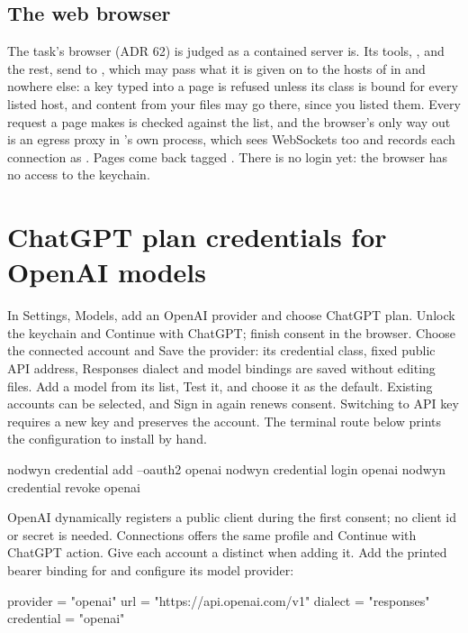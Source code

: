 \subsection*{The web browser}

The task's browser (ADR 62) is judged as a contained server is. Its tools,
,  and the rest, send to
, which may pass what it is given on to the hosts of
 in  and nowhere else: a key typed
into a page is refused unless its class is bound for every listed host,
and content from your files may go there, since you listed them. Every
request a page makes is checked against the list, and the browser's only
way out is an egress proxy in \nodwyn{}'s own process, which sees
WebSockets too and records each connection as .
Pages come back tagged . There is no login yet: the
browser has no access to the keychain.


\section{ChatGPT plan credentials for OpenAI models}

In Settings, Models, add an OpenAI provider and choose ChatGPT plan.
Unlock the keychain and Continue with ChatGPT; finish consent in the browser.
Choose the connected account and Save the provider: its credential class,
fixed public API address, Responses dialect and model bindings are saved
without editing files. Add a model from its list, Test it, and choose it as
the default. Existing accounts can be selected, and Sign in again renews
consent. Switching to API key requires a new key and preserves the account.
The terminal route below prints the configuration to install by hand.


\begin{sh}
nodwyn credential add --oauth2 openai
nodwyn credential login openai
nodwyn credential revoke openai
\end{sh}

OpenAI dynamically registers a public client during the first consent;
no client id or secret is needed. Connections offers the same profile and
Continue with ChatGPT action. Give each account a distinct 
when adding it. Add the printed bearer binding for 
and configure its model provider:

\begin{toml}
provider = "openai"
url = "https://api.openai.com/v1"
dialect = "responses"
credential = "openai"
\end{toml}

